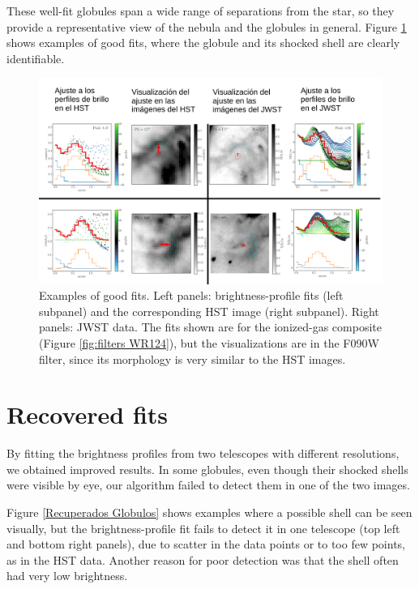\documentclass{book}
\begin{document}
These well-fit globules span a wide range of separations from the
star, so they provide a representative view of the nebula and the
globules in general. Figure \ref{Goog G} shows examples of good fits,
where the globule and its shocked shell are clearly identifiable.

\begin{figure}[htb]
    \centering
    \includegraphics[width=\textwidth]{imagenes_corregidas/buenos_aj.pdf}
    \caption{Examples of good fits. Left panels: brightness-profile
      fits (left subpanel) and the corresponding HST image (right
      subpanel). Right panels: JWST data. The fits shown are for the
      ionized-gas composite (Figure \ref{fig:filters WR124}), but the
      visualizations are in the F090W filter, since its morphology is
      very similar to the HST images.}
    \label{Goog G}
\end{figure}

\section{Recovered fits}

By fitting the brightness profiles from two telescopes with different
resolutions, we obtained improved results. In some globules, even
though their shocked shells were visible by eye, our algorithm failed
to detect them in one of the two images.

Figure \ref{Recuperados Globulos} shows examples where a possible
shell can be seen visually, but the brightness-profile fit fails to
detect it in one telescope (top left and bottom right panels), due to
scatter in the data points or to too few points, as in the HST data.
Another reason for poor detection was that the shell often had very
low brightness.
\end{document}
